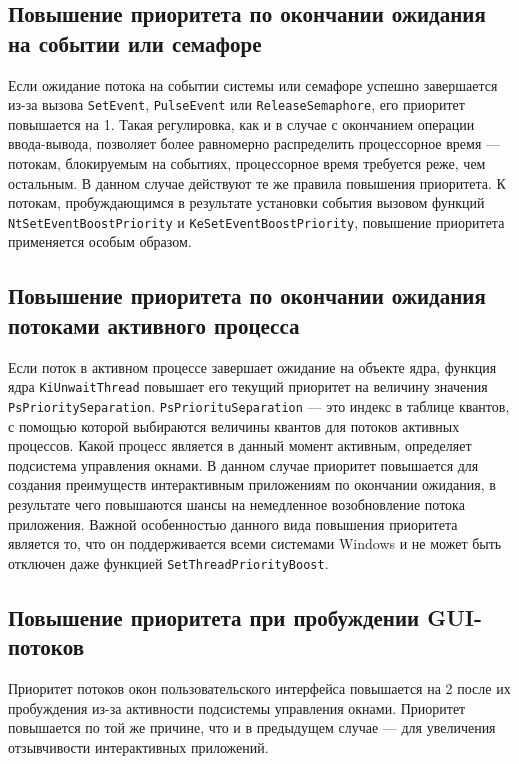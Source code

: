\documentclass[a4paper,oneside,14pt]{extreport}
\newcommand{\code}[1]{\texttt{#1}}
\begin{document}
	\subsection{Повышение приоритета по окончании ожидания на событии или семафоре}
	Если ожидание потока на событии системы или семафоре успешно завершается из-за вызова \code{SetEvent}, \code{PulseEvent} или \code{ReleaseSemaphore}, его приоритет повышается на 1.
	Такая регулировка, как и в случае с окончанием операции ввода-вывода, позволяет более равномерно распределить процессорное время --- потокам, блокируемым на событиях, процессорное время требуется реже, чем остальным. В данном случае действуют те же правила повышения приоритета.
	К потокам, пробуждающимся в результате установки события вызовом функций \code{NtSetEventBoostPriority} и \code{KeSetEventBoostPriority}, повышение приоритета применяется особым образом.
	\subsection{Повышение приоритета по окончании ожидания потоками активного процесса}
	Если поток в активном процессе завершает ожидание на объекте ядра, функция ядра \code{KiUnwaitThread} повышает его текущий приоритет на величину значения \code{PsPrioritySeparation}. \code{PsPriorituSeparation} --- это индекс в таблице квантов, с помощью которой выбираются величины квантов для потоков активных процессов. Какой процесс является в данный момент активным, определяет подсистема управления окнами.
	В данном случае приоритет повышается для создания преимуществ интерактивным приложениям по окончании ожидания, в результате чего повышаются шансы на немедленное возобновление потока приложения.
	Важной особенностью данного вида повышения приоритета является то, что он поддерживается всеми системами Windows и не может быть отключен даже функцией \code{SetThreadPriorityBoost}.
	\subsection{Повышение приоритета при пробуждении GUI-потоков}
	Приоритет потоков окон пользовательского интерфейса повышается на 2 после их пробуждения из-за активности подсистемы управления окнами. Приоритет повышается по той же причине, что и в предыдущем случае --- для увеличения отзывчивости интерактивных приложений.
\end{document}
